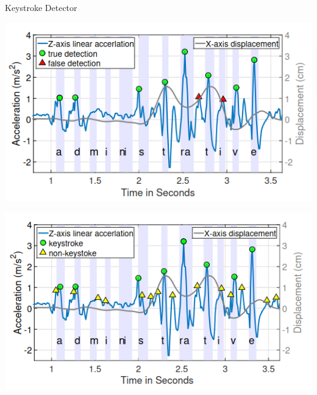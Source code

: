 \documentclass[ucs,9pt,usenames,dvipsnames]{beamer}
\begin{document}
\begin{frame}{Keystroke Detector}
	
	
	\begin{minipage}[c]{0.49\linewidth}
		\includegraphics[width=\textwidth]{imgs/peakdetection}
	\end{minipage}
	\begin{minipage}[c]{0.49\linewidth}
		\includegraphics[width=\textwidth]{imgs/baggedDecision}

\end{minipage}
\end{frame}
\end{document}
